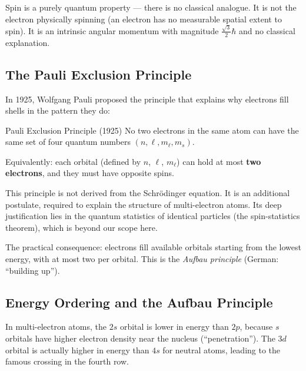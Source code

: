 \documentclass[12pt, a4paper]{book}
\newcommand{\newterm}[1]{\textit{\textcolor{DiscoveryColor}{#1}}}
\begin{document}
\vspace{0.5em}

Spin is a purely quantum property --- there is no classical
analogue.
It is not the electron physically spinning (an electron
has no measurable spatial extent to spin).
It is an intrinsic angular momentum with magnitude
$\frac{\sqrt{3}}{2}\hbar$ and no classical explanation.

\subsection{The Pauli Exclusion Principle}

In 1925, Wolfgang Pauli proposed the principle that explains
why electrons fill shells in the pattern they do:

\begin{namedconcept}{Pauli Exclusion Principle (1925)}
No two electrons in the same atom can have the same
set of four quantum numbers $(n, \ell, m_\ell, m_s)$.

Equivalently: each orbital (defined by $n$, $\ell$, $m_\ell$)
can hold at most \textbf{two electrons}, and they must have
opposite spins.
\end{namedconcept}

\vspace{0.5em}

This principle is not derived from the Schr\"{o}dinger equation.
It is an additional postulate, required to explain
the structure of multi-electron atoms.
Its deep justification lies in the quantum statistics
of identical particles (the spin-statistics theorem),
which is beyond our scope here.

The practical consequence: electrons fill available orbitals
starting from the lowest energy, with at most two per orbital.
This is the \newterm{Aufbau principle} (German: ``building up'').

\subsection{Energy Ordering and the Aufbau Principle}

In multi-electron atoms, the $2s$ orbital is lower in energy
than $2p$, because $s$ orbitals have higher electron
density near the nucleus (``penetration'').
The $3d$ orbital is actually higher in energy than $4s$
for neutral atoms, leading to the famous crossing in the
fourth row.
\end{document}
